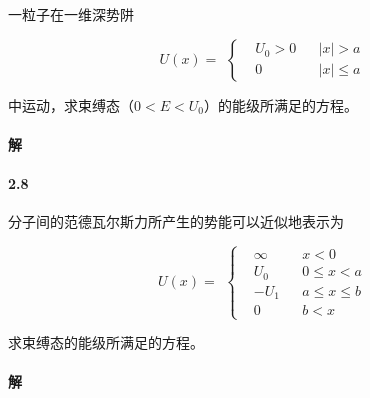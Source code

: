 \documentclass{article}
\begin{document}
一粒子在一维深势阱

\begin{equation*}
  \begin{aligned}
    U \left( x \right) =
  \end{aligned}
  \left\{
  \begin{aligned}
    & U_0 > 0 && \left| x \right| > a \\
    & 0 && \left| x \right| \leq a
  \end{aligned}
  \right.
\end{equation*}

中运动，求束缚态（$0<E<U_0$）的能级所满足的方程。

\paragraph{解}

\paragraph{2.8}

分子间的范德瓦尔斯力所产生的势能可以近似地表示为

\begin{equation*}
  \begin{aligned}
    U \left( x  \right) = 
  \end{aligned}
  \left\{
  \begin{aligned}
    & \infty && x<0 \\
    & U_0 && 0 \leq x < a \\
    & - U_1 && a \leq x \leq b \\
    & 0 && b < x
  \end{aligned}
  \right.
\end{equation*}

求束缚态的能级所满足的方程。

\paragraph{解}
\end{document}
